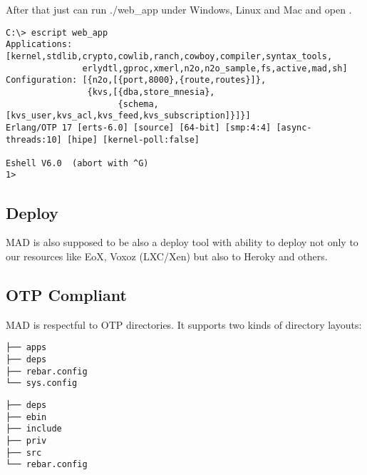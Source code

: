 After that just can run ./web_app under Windows, Linux and
Mac and open .

\vspace{1\baselineskip}
\begin{lstlisting}
C:\> escript web_app
Applications: [kernel,stdlib,crypto,cowlib,ranch,cowboy,compiler,syntax_tools,
               erlydtl,gproc,xmerl,n2o,n2o_sample,fs,active,mad,sh]
Configuration: [{n2o,[{port,8000},{route,routes}]},
                {kvs,[{dba,store_mnesia},
                      {schema,[kvs_user,kvs_acl,kvs_feed,kvs_subscription]}]}]
Erlang/OTP 17 [erts-6.0] [source] [64-bit] [smp:4:4] [async-threads:10] [hipe] [kernel-poll:false]

Eshell V6.0  (abort with ^G)
1>
\end{lstlisting}
\vspace{1\baselineskip}

\subsection{Deploy}

MAD is also supposed to be also a deploy tool with ability to
deploy not only to our resources like EoX, Voxoz (LXC/Xen) but
also to Heroky and others.

\subsection{OTP Compliant}

MAD is respectful to OTP directories. It supports two kinds of directory layouts:

\vspace{1\baselineskip}
\begin{lstlisting}[caption=Solution]
├── apps
├── deps
├── rebar.config
└── sys.config
\end{lstlisting}
\vspace{1\baselineskip}

\vspace{1\baselineskip}
\begin{lstlisting}[caption=OTP Application]
├── deps
├── ebin
├── include
├── priv
├── src
└── rebar.config
\end{lstlisting}
\vspace{1\baselineskip}
